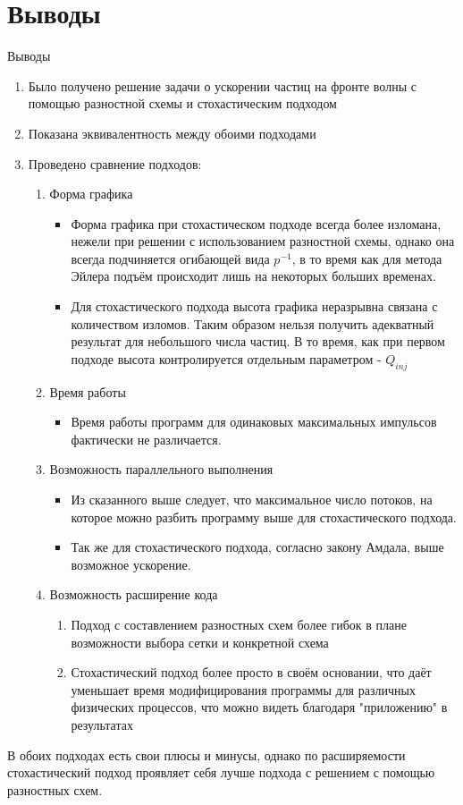 \documentclass[8pt,pdf,hyperref={unicode},serif]{beamer}
\begin{document}
\section{Выводы}
\begin{frame}{Выводы}
\begin{enumerate}
\item Было получено решение задачи о ускорении частиц на фронте волны с помощью разностной схемы и стохастическим подходом
\item Показана эквивалентность между обоими подходами
\item Проведено сравнение подходов:
\begin{enumerate}
\item Форма графика
\begin{itemize}
\item Форма графика при стохастическом подходе всегда более изломана, нежели при решении с использованием разностной схемы, однако она всегда подчиняется огибающей вида $p^{-1}$, в то время как для метода Эйлера подъём происходит лишь на некоторых больших временах.
\item Для стохастического подхода высота графика неразрывна связана с количеством изломов. Таким образом нельзя получить адекватный результат для небольшого числа частиц. В то время, как при первом подходе высота контролируется отдельным параметром - $Q_{inj}$
\end{itemize}
\item Время работы
\begin{itemize}
\item Время работы программ для одинаковых максимальных импульсов фактически не различается.
\end{itemize}
\item Возможность параллельного выполнения
\begin{itemize}
\item Из сказанного выше следует, что максимальное число потоков, на которое можно разбить программу выше для стохастического подхода.
\item Так же для стохастического подхода, согласно закону Амдала, выше возможное ускорение.
\end{itemize}
\item Возможность расширение кода
\begin{enumerate}
\item Подход с составлением разностных схем более гибок в плане возможности выбора сетки и конкретной схема
\item Стохастический подход более просто в своём основании, что даёт уменьшает время модифицирования программы для различных физических процессов, что можно видеть благодаря "приложению" в результатах
\end{enumerate}
\end{enumerate}
\end{enumerate}
\pause
В обоих подходах есть свои плюсы и минусы, однако по расширяемости стохастический подход проявляет себя лучше подхода с решением с помощью разностных схем.
\end{frame}
\end{document}
